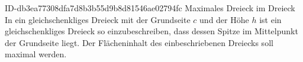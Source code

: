 \begin{exercise}
      {ID-db3ea77308dfa7d8b3b55d9b8d81546ae02794fc}
      {Maximales Dreieck im Dreieck}
  \ifproblem\problem
    In ein gleichschenkliges Dreieck mit der Grundseite $c$ und der Höhe $h$
    ist ein gleichschenkliges Dreieck so einzubeschreiben, dass dessen Spitze
    im Mittelpunkt der Grundseite liegt. Der Flächeninhalt des einbeschriebenen
    Dreiecks soll maximal werden.
  \fi
\end{exercise}
